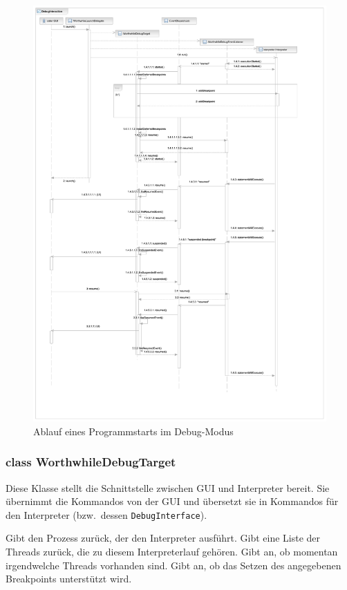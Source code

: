 \begin{figure}
	\centering
	\caption{Ablauf eines Programmstarts im Debug-Modus}
	\includegraphics[height=\textheight]{diagrams/debug_sequence.pdf}
\end{figure}

\subsubsection{class WorthwhileDebugTarget}

Diese Klasse stellt die Schnittstelle zwischen GUI und Interpreter bereit. Sie übernimmt die Kommandos von der GUI und übersetzt sie in Kommandos für den Interpreter (bzw.\ dessen \texttt{DebugInterface}).

\begin{description}
	 Gibt den Prozess zurück, der den Interpreter ausführt.
	 Gibt eine Liste der Threads zurück, die zu diesem Interpreterlauf gehören.
	 Gibt an, ob momentan irgendwelche Threads vorhanden sind.
	 Gibt an, ob das Setzen des angegebenen Breakpoints unterstützt wird.
\end{description}

